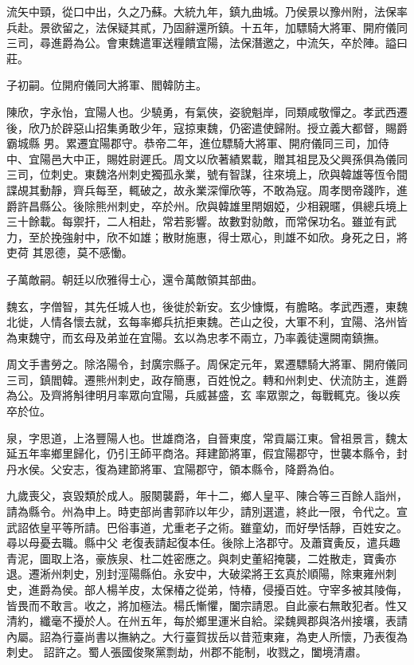 \begin{pinyinscope}
 流矢中頸，從口中出，久之乃蘇。大統九年，鎮九曲城。乃侯景以豫州附，法保率兵赴。景欲留之，法保疑其貳，乃固辭還所鎮。十五年，加驃騎大將軍、開府儀同三司，尋進爵為公。會東魏遣軍送糧饋宜陽，法保潛邀之，中流矢，卒於陣。謚曰莊。



 子初嗣。位開府儀同大將軍、閻韓防主。



 陳欣，字永怡，宜陽人也。少驍勇，有氣俠，姿貌魁岸，同類咸敬憚之。孝武西遷後，欣乃於辟惡山招集勇敢少年，寇掠東魏，仍密遣使歸附。授立義大都督，賜爵霸城縣
 男。累遷宜陽郡守。恭帝二年，進位驃騎大將軍、開府儀同三司，加侍中、宜陽邑大中正，賜姓尉遲氏。周文以欣著績累載，贈其祖昆及父興孫俱為儀同三司，位刺史。東魏洛州刺史獨孤永業，號有智謀，往來境上，欣與韓雄等恆令間諜覘其動靜，齊兵每至，輒破之，故永業深憚欣等，不敢為寇。周孝閔帝踐阼，進爵許昌縣公。後除熊州刺史，卒於州。欣與韓雄里閈姻婭，少相親暱，俱總兵境上三十餘載。每禦扞，二人相赴，常若影響。故數對勍敵，而常保功名。雖並有武力，至於挽強射中，欣不如雄；散財施惠，得士眾心，則雄不如欣。身死之日，將吏荷
 其恩德，莫不感慟。



 子萬敵嗣。朝廷以欣雅得士心，還令萬敵領其部曲。



 魏玄，字僧智，其先任城人也，後徙於新安。玄少慷慨，有膽略。孝武西遷，東魏北徙，人情各懷去就，玄每率鄉兵抗拒東魏。芒山之役，大軍不利，宜陽、洛州皆為東魏守，而玄母及弟並在宜陽。玄以為忠孝不兩立，乃率義徒還闕南鎮撫。



 周文手書勞之。除洛陽令，封廣宗縣子。周保定元年，累遷驃騎大將軍、開府儀同三司，鎮閻韓。遷熊州刺史，政存簡惠，百姓悅之。轉和州刺史、伏流防主，進爵為公。及齊將斛律明月率眾向宜陽，兵威甚盛，玄
 率眾禦之，每戰輒克。後以疾卒於位。



 泉，字思道，上洛豐陽人也。世雄商洛，自晉東度，常貢屬江東。曾祖景言，魏太延五年率鄉里歸化，仍引王師平商洛。拜建節將軍，假宜陽郡守，世襲本縣令，封丹水侯。父安志，復為建節將軍、宜陽郡守，領本縣令，降爵為伯。



 九歲喪父，哀毀類於成人。服闋襲爵，年十二，鄉人皇平、陳合等三百餘人詣州，請為縣令。州為申上。時吏部尚書郭祚以年少，請別選遣，終此一限，令代之。宣武詔依皇平等所請。巴俗事道，尤重老子之術。雖童幼，而好學恬靜，百姓安之。尋以母憂去職。縣中父
 老復表請起復本任。後除上洛郡守。及蕭寶夤反，遣兵趣青泥，圖取上洛，豪族泉、杜二姓密應之。與刺史董紹掩襲，二姓散走，寶夤亦退。遷淅州刺史，別封涇陽縣伯。永安中，大破梁將王玄真於順陽，除東雍州刺史，進爵為侯。部人楊羊皮，太保椿之從弟，恃椿，侵擾百姓。守宰多被其陵侮，皆畏而不敢言。收之，將加極法。楊氏慚懼，闔宗請恩。自此豪右無敢犯者。性又清約，纖毫不擾於人。在州五年，每於鄉里運米自給。梁魏興郡與洛州接壤，表請內屬。詔為行臺尚書以撫納之。大行臺賀拔岳以昔蒞東雍，為吏人所懷，乃表復為刺史。
 詔許之。蜀人張國俊聚黨剽劫，州郡不能制，收戮之，闔境清肅。




\end{pinyinscope}
